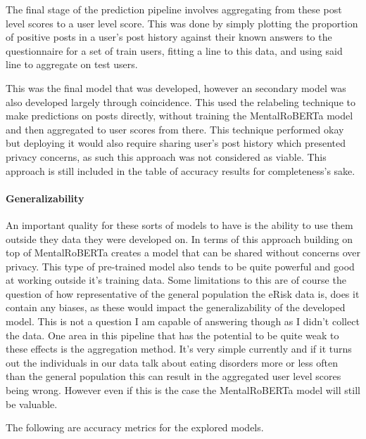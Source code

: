 \documentclass[12pt, titlepage]{article}
\begin{document}
\begin{enumerate}
The final stage of the prediction pipeline involves aggregating from these post level scores to a user level score. This was done by simply plotting the proportion of positive posts in a user's post history against their known answers to the questionnaire for a set of train users, fitting a line to this data, and using said line to aggregate on test users.

This was the final model that was developed, however an secondary model was also developed largely through coincidence. This used the relabeling technique to make predictions on posts directly, without training the MentalRoBERTa model and then aggregated to user scores from there. This technique performed okay but deploying it would also require sharing user's post history which presented privacy concerns, as such this approach was not considered as viable. This approach is still included in the table of accuracy results for completeness's sake.

\paragraph{Generalizability\newline}

An important quality for these sorts of models to have is the ability to use them outside they data they were developed on. In terms of this approach building on top of MentalRoBERTa creates a model that can be shared without concerns over privacy. This type of pre-trained model also tends to be quite powerful and good at working outside it's training data. Some limitations to this are of course the question of how representative of the general population the eRisk data is, does it contain any biases, as these would impact the generalizability of the developed model. This is not a question I am capable of answering though as I didn't collect the data. One area in this pipeline that has the potential to be quite weak to these effects is the aggregation method. It's very simple currently and if it turns out the individuals in our data talk about eating disorders more or less often than the general population this can result in the aggregated user level scores being wrong. However even if this is the case the MentalRoBERTa model will still be valuable.

The following are accuracy metrics for the explored models.


\end{enumerate}
\end{document}
